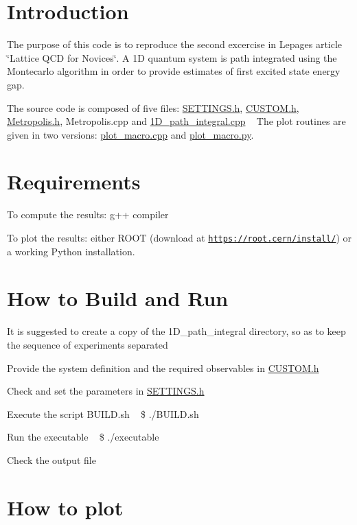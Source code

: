 \hypertarget{index_intro}{}\section{Introduction}\label{index_intro}
The purpose of this code is to reproduce the second excercise in Lepage\textquotesingle{}s article \char`\"{}\+Lattice Q\+C\+D for Novices\char`\"{}. A 1D quantum system is path integrated using the Montecarlo algorithm in order to provide estimates of first excited state energy gap.

The source code is composed of five files\+: \hyperlink{SETTINGS_8h}{S\+E\+T\+T\+I\+N\+G\+S.\+h}, \hyperlink{CUSTOM_8h}{C\+U\+S\+T\+O\+M.\+h}, \hyperlink{Metropolis_8h}{Metropolis.\+h}, Metropolis.\+cpp and \hyperlink{1D__path__integral_8cpp}{1\+D\+\_\+path\+\_\+integral.\+cpp} ~\newline
The plot routines are given in two versions\+: \hyperlink{plot__macro_8cpp}{plot\+\_\+macro.\+cpp} and \hyperlink{plot__macro_8py}{plot\+\_\+macro.\+py}.\hypertarget{index_reqs}{}\section{Requirements}\label{index_reqs}

\begin{DoxyItemize}
\item To compute the results\+: g++ compiler
\item To plot the results\+: either R\+O\+OT (download at \href{https://root.cern/install/}{\tt https\+://root.\+cern/install/}) or a working Python installation.
\end{DoxyItemize}\hypertarget{index_build}{}\section{How to Build and Run}\label{index_build}

\begin{DoxyItemize}
\item It is suggested to create a copy of the 1\+D\+\_\+path\+\_\+integral directory, so as to keep the sequence of experiments separated
\item Provide the system definition and the required observables in \hyperlink{CUSTOM_8h}{C\+U\+S\+T\+O\+M.\+h}
\item Check and set the parameters in \hyperlink{SETTINGS_8h}{S\+E\+T\+T\+I\+N\+G\+S.\+h}
\item Execute the script B\+U\+I\+L\+D.\+sh ~\newline
 \$ ./\+B\+U\+I\+LD.sh
\item Run the executable ~\newline
 \$ ./executable
\item Check the output file
\end{DoxyItemize}\hypertarget{index_plot}{}\section{How to plot}\label{index_plot}

